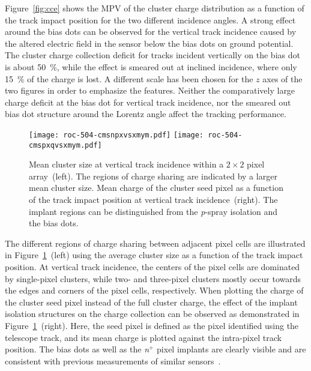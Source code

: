 \documentclass[a4paper,11pt]{article}
\begin{document}
Figure~\ref{fig:cce} shows the MPV of the cluster charge distribution as a function of the track impact position for the two different incidence angles.
A strong effect around the bias dots can be observed for the vertical track incidence caused by the altered electric field in the sensor below the bias dots on ground potential.
The cluster charge collection deficit for tracks incident vertically on the bias dot is about \SI{50}{\percent}, while the effect is smeared out at inclined incidence, where only \SI{15}{\percent} of the charge is lost.
A different scale has been chosen for the $z$ axes of the two figures in order to emphasize the features.
Neither the comparatively large charge deficit at the bias dot for vertical track incidence, nor the smeared out bias dot structure around the Lorentz angle affect the tracking performance.

\begin{figure}[tbp]
  \centering
  \texttt{[image: roc-504-cmsnpxvsxmym.pdf]}%
  \texttt{[image: roc-504-cmspxqvsxmym.pdf]}
  \caption[Mean cluster size and mean seed pixel charge in a $2\times2$ pixel array]{Mean cluster size at vertical track incidence within a $2\times2$ pixel array~(left). The regions of charge sharing are indicated by a larger mean cluster size. Mean charge of the cluster seed pixel as a function of the track impact position at vertical track incidence~(right). The implant regions can be distinguished from the \emph{p}-spray isolation and the bias dots.}
  \label{fig:cce:seed}
\end{figure}

The different regions of charge sharing between adjacent pixel cells are illustrated in Figure~\ref{fig:cce:seed}~(left) using the average cluster size as a function of the track impact position.
At vertical track incidence, the centers of the pixel cells are dominated by single-pixel clusters, while two- and three-pixel clusters mostly occur towards the edges and corners of the pixel cells, respectively.
When plotting the charge of the cluster seed pixel instead of the full cluster charge, the effect of the implant isolation structures on the charge collection can be observed as demonstrated in Figure~\ref{fig:cce:seed}~(right).
Here, the seed pixel is defined as the pixel identified using the telescope track, and its mean charge is plotted against the intra-pixel track position.
The bias dots as well as the \emph{n$^+$} pixel implants are clearly visible and are consistent with previous measurements of similar sensors~\cite{rohe-cce}.
\end{document}

